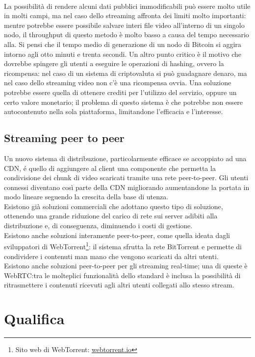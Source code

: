 	\\
	La possibilità di rendere alcuni dati pubblici immodificabili può essere molto utile in molti campi, ma nel caso dello streaming affronta dei limiti molto importanti: mentre potrebbe essere possibile salvare interi file video all'interno di un singolo nodo, il throughput di questo metodo è molto basso a causa del tempo necessario alla. Si pensi che il tempo medio di generazione di un nodo di Bitcoin si aggira intorno agli otto minuti e trenta secondi. Un altro punto critico è il motivo che dovrebbe spingere gli utenti a eseguire le operazioni di hashing, ovvero la ricompensa: nel caso di un sistema di criptovaluta si può guadagnare denaro, ma nel caso dello streaming video non c'è una ricompensa ovvia. Una soluzione potrebbe essere quella di ottenere crediti per l'utilizzo del servizio, oppure un certo valore monetario; il problema di questo sistema è che potrebbe non essere autocontenuto nella sola piattaforma, limitandone l'efficacia e l'interesse.


	\subsection{Streaming peer to peer}
	Un nuovo sistema di distribuzione, particolarmente efficace se accoppiato ad una CDN, é quello di aggiungere al client una componente che permetta la condivisione dei chunk di video scaricati tramite una rete peer-to-peer. Gli utenti connessi diventano così parte della CDN migliorando aumentandone la portata in modo lineare seguendo la crescita della base di utenza.
	\\
	Esistono già soluzioni commerciali che adottano questo tipo di soluzione, ottenendo una grande riduzione del carico di rete sui server adibiti alla distribuzione e, di conseguenza, diminuendo i costi di gestione.
	\\
	Esistono anche soluzioni interamente peer-to-peer, come quella ideata dagli sviluppatori di WebTorrent\footnote{Sito web di WebTorrent: \href{https://webtorrent.io/}{webtorrent.io}}: il sistema sfrutta la rete BitTorrent e permette di condividere i contenuti man mano che vengono scaricati da altri utenti.
	\\
	Esistono anche soluzioni peer-to-peer per gli streaming real-time; una di queste è WebRTC:\@ tra le molteplici funzionalità dello standard è inclusa la possibilità di ritrasmettere i contenuti ricevuti agli altri utenti collegati allo stesso stream.

\section{Qualifica}
